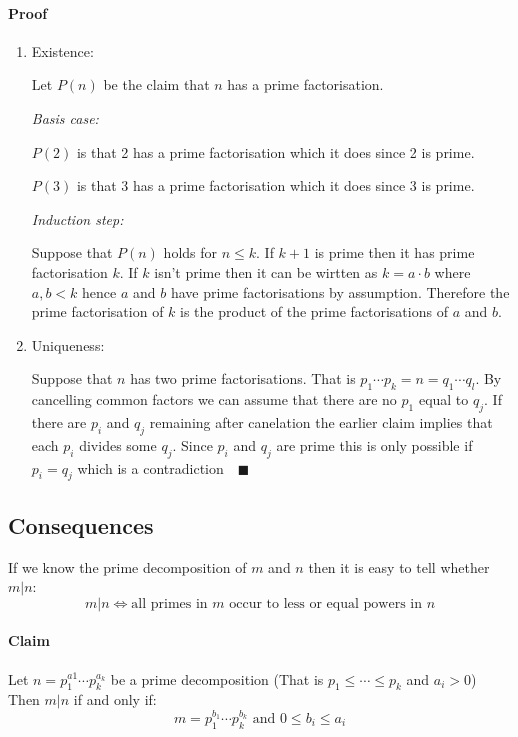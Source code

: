 \documentclass{article}
\begin{document}
\paragraph{Proof}
\begin{enumerate}
\item Existence:

 Let \(P(n)\) be the claim that \(n\) has a prime factorisation.

\emph{Basis case:}

\(P(2)\) is that 2 has a prime factorisation which it does since 2 is prime.

\(P(3)\) is that 3 has a prime factorisation which it does since 3 is prime.

\emph{Induction step:}

Suppose that \(P(n)\) holds for \(n\le k\). If \(k+1\) is prime then it has prime factorisation \(k\). If \(k\) isn't prime then it can be wirtten as \(k=a\cdot b\) where \(a,b<k\) hence \(a\) and \(b\) have prime factorisations by assumption. Therefore the prime factorisation of \(k\) is the product of the prime factorisations of \(a\) and \(b\).

\item Uniqueness:

Suppose that \(n\) has two prime factorisations. That is \(p_1\dotsm p_k = n = q_1\dotsm q_l\). By cancelling common factors we can assume that there are no \(p_1\) equal to \(q_j\). If there are \(p_i\) and \(q_j\) remaining after canelation the earlier claim implies that each \(p_i\) divides some \(q_j\). Since \(p_i\) and \(q_j\) are prime this is only possible if \(p_i=q_j\) which is a contradiction\(\quad\blacksquare\)
\end{enumerate}

\subsection*{Consequences}

If we know the prime decomposition of \(m\) and \(n\) then it is easy to tell whether \(m|n\):
\[m|n\iff \text{all primes in \(m\) occur to less or equal powers in \(n\)}\]

\paragraph{Claim} Let \(n=p_1^{a1}\dotsm p_k^{a_k}\) be a prime decomposition (That is \(p_1\le\dotsb\le p_k\) and \(a_i>0\)) Then \(m|n\) if and only if:
\[m=p_1^{b_1}\dotsm p_k^{b_k} \text{ and }0\le b_i \le a_i\]
\end{document}
